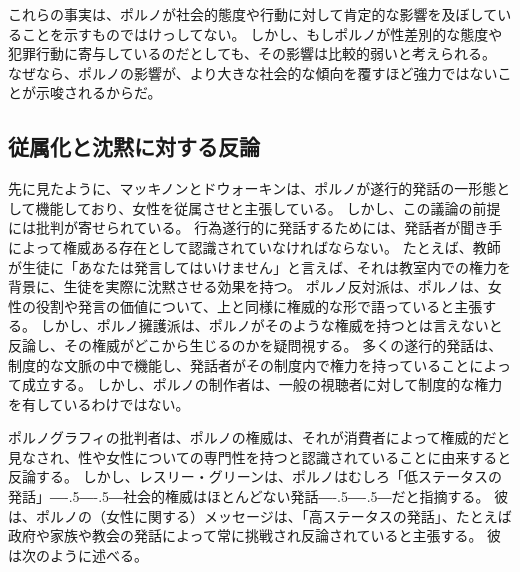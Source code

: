 \documentclass[paper=a4,book,openany]{jlreq}
\newcommand{\ig}[1]{}           %
\def\DDASH{―\kern-.5\zw―\kern-.5\zw―} %
\begin{document}
これらの事実は、ポルノが社会的態度や行動に対して肯定的な影響を及ぼしていることを示すものではけっしてない。
しかし、もしポルノが性差別的な態度や犯罪行動に寄与しているのだとしても、その影響は比較的弱いと考えられる。
なぜなら、ポルノの影響が、より大きな社会的な傾向を覆すほど強力ではないことが示唆されるからだ。

\subsection{従属化と沈黙に対する反論}

先に見たように、マッキノンとドウォーキンは、ポルノが遂行的発話の一形態として機能しており、女性を従属させと主張している。
しかし、この議論の前提には批判が寄せられている。
行為遂行的に発話するためには、発話者が聞き手によって権威ある存在として認識されていなければならない。
たとえば、教師が生徒に「あなたは発言してはいけません」と言えば、それは教室内での権力を背景に、生徒を実際に沈黙させる効果を持つ。
ポルノ反対派は、ポルノは、女性の役割や発言の価値について、上と同様に権威的な形で語っていると主張する。
しかし、ポルノ擁護派は、ポルノがそのような権威を持つとは言えないと反論し、その権威がどこから生じるのかを疑問視する。
多くの遂行的発話は、制度的な文脈の中で機能し、発話者がその制度内で権力を持っていることによって成立する。
しかし、ポルノの制作者は、一般の視聴者に対して制度的な権力を有しているわけではない。

ポルノグラフィの批判者は、ポルノの権威は、それが消費者によって権威的だと見なされ、性や女性についての専門性を持つと認識されていることに由来すると反論する\citep[p.430]{langton12:_respon}。
しかし、レスリー・グリーン\ig{Leslie Green}は、ポルノはむしろ「低ステータスの発話」{\DDASH}社会的権威はほとんどない発話{\DDASH}だと指摘する。
彼は、ポルノの（女性に関する）メッセージは、「高ステータスの発話」、たとえば政府や家族や教会の発話によって常に挑戦され反論されていると主張する。
彼は次のように述べる。
\end{document}
